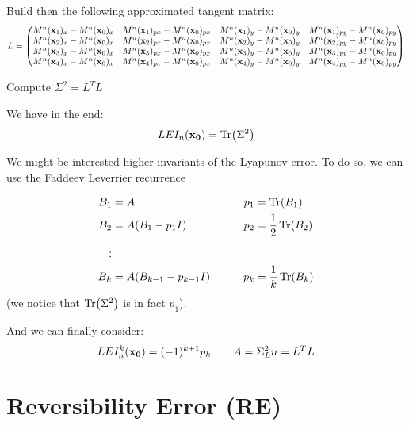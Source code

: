 \documentclass[10pt,a4paper]{article}
\begin{document}
Build then the following approximated tangent matrix:
\begin{equation}
    L = \begin{pmatrix}
        M^n(\vb{x}_1)_x - M^n(\vb{x}_0)_x & M^n(\vb{x}_1)_{px} - M^n(\vb{x}_0)_{px} &
        M^n(\vb{x}_1)_y - M^n(\vb{x}_0)_y & M^n(\vb{x}_1)_{py} - M^n(\vb{x}_0)_{py} \\
        M^n(\vb{x}_2)_x - M^n(\vb{x}_0)_x & M^n(\vb{x}_2)_{px} - M^n(\vb{x}_0)_{px} &
        M^n(\vb{x}_2)_y - M^n(\vb{x}_0)_y & M^n(\vb{x}_2)_{py} - M^n(\vb{x}_0)_{py} \\
        M^n(\vb{x}_3)_x - M^n(\vb{x}_0)_x & M^n(\vb{x}_3)_{px} - M^n(\vb{x}_0)_{px} &
        M^n(\vb{x}_3)_y - M^n(\vb{x}_0)_y & M^n(\vb{x}_3)_{py} - M^n(\vb{x}_0)_{py} \\
        M^n(\vb{x}_4)_x - M^n(\vb{x}_0)_x & M^n(\vb{x}_4)_{px} - M^n(\vb{x}_0)_{px} &
        M^n(\vb{x}_4)_y - M^n(\vb{x}_0)_y & M^n(\vb{x}_4)_{py} - M^n(\vb{x}_0)_{py} \\ 
    \end{pmatrix}
\end{equation}

Compute $\Sigma^2 = L^TL$

We have in the end:
\begin{equation}
    LEI_n(\vb{x_0}) = \Tr(\Sigma^2)
\end{equation}

We might be interested higher invariants of the Lyapunov error. To do so, we can use the Faddeev Leverrier recurrence

\begin{align}
    B_1 &= A \qquad &p_1 &= \Tr(B_1) \\
    B_2 &= A(B_1 - p_1 I) \qquad &p_2 &= \frac{1}{2} \Tr(B_2) \\
    \vdots\\
    B_k &= A(B_{k-1} - p_{k-1} I) \qquad &p_k &= \frac{1}{k} \Tr(B_k) \\
\end{align}
(we notice that $\Tr(\Sigma^2)$ is in fact $p_1$).

And we can finally consider:
\begin{equation}
    LEI^k_n(\vb{x_0}) = (-1)^{k+1} p_k \qquad A=\Sigma^2_Ln = L^TL
\end{equation}

\section{Reversibility Error (RE)}
\end{document}
